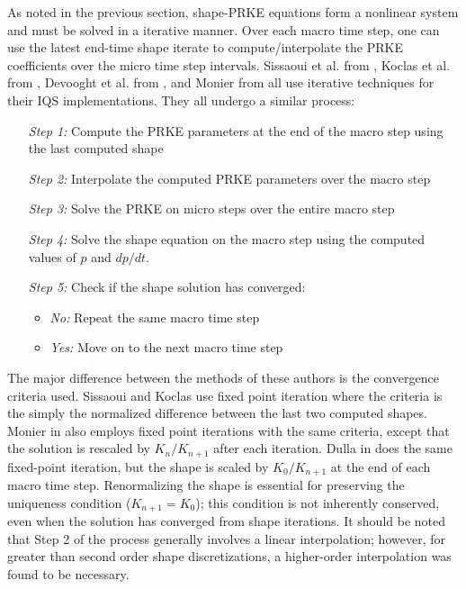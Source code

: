 \documentclass{elsarticle}
\begin{document}
As noted in the previous section, shape-PRKE equations form a nonlinear system and must be solved in a iterative manner.  Over each macro time step,  one can 
use the latest end-time shape iterate to compute/interpolate the PRKE coefficients over the micro time step intervals. 
Sissaoui et al. from \cite{Sissaoui_1995}, Koclas et al. from \cite{Koclas_1996}, Devooght et al. from \cite{Devooght_1984}, and Monier from \cite{Monier_diss} all use 
iterative techniques for their IQS implementations.  They all undergo a similar process:
\begin{adjustwidth*}{0cm}{4mm}
\begin{itemize}
\item[\textit{Step 1:}] Compute the PRKE parameters at the end of the macro step using the last computed shape
\item[\textit{Step 2:}] Interpolate the computed PRKE parameters over the macro step
\item[\textit{Step 3:}] Solve the PRKE on micro steps over the entire macro step
\item[\textit{Step 4:}] Solve the shape equation on the macro step using the computed values of $p$ and $dp/dt$.
\item[\textit{Step 5:}] Check if the shape solution has converged:
	\begin{itemize}
	\item \textit{No:} Repeat the same macro time step
	\item \textit{Yes:} Move on to the next macro time step
	\end{itemize}
\end{itemize}
\end{adjustwidth*}

The major difference between the methods of these authors is the convergence criteria used.  Sissaoui and Koclas \cite{Sissaoui_1995, Koclas_1996} 
use fixed point iteration where the criteria is the simply the normalized difference between the last two computed shapes.  Monier in \cite{Monier_diss} 
also employs fixed point iterations with the same criteria, except that the solution is rescaled by $K_n/K_{n+1}$ after each iteration. Dulla in 
\cite{Dulla2008} does the same fixed-point iteration, but the shape is scaled by $K_0/K_{n+1}$ at the end of each macro time step. Renormalizing 
the shape is essential for preserving the uniqueness condition ($K_{n+1} = K_0$); this condition is not inherently conserved, even when the 
solution has converged from shape iterations.
It should be noted that Step 2 of the process generally involves a linear interpolation; however, for greater than second order shape discretizations, a higher-order interpolation was found to be necessary. 
\end{document}
